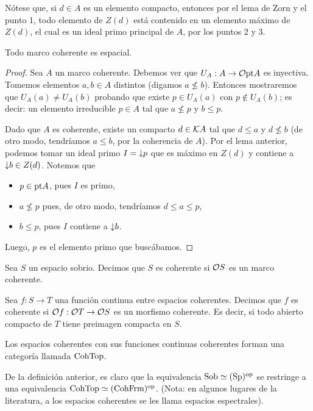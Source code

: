 Nótese que, si $d\in A$ es un elemento compacto,
entonces por el lema de Zorn y el punto 1,
todo elemento de $Z(d)$ está contenido en un elemento máximo de
$Z(d)$, el cual es un ideal primo principal de $A$,
por los puntos 2 y 3.


\begin{lemma}
    Todo marco coherente es espacial.
\end{lemma}
\begin{proof}
    Sea $A$ un marco coherente.
    Debemos ver que $U_A:A\to\cal O\pt A$ es inyectiva.
    Tomemos elementos $a,b\in A$ distintos (digamos $a\nleq b$).
    Entonces mostraremos que $U_A(a)\neq U_A(b)$
    probando que existe $p\in U_A(a)$ con $p\nin U_A(b)$;
    es decir: un elemento irreducible $p\in A$
    tal que $a\nleq p$ y $b\leq p$.
    
    Dado que $A$ es coherente, existe un compacto $d\in\cal KA$
    tal que $d\leq a$ y $d\nleq b$
    (de otro modo, tendríamos $a\leq b$, por la coherencia de $A$).
    Por el lema anterior, podemos tomar un ideal primo
    $I=\down p$ que es máximo en $Z(d)$
    y contiene a $\down b\in Z(d)$.
    Notemos que
    \begin{itemize}
        \item $p\in\pt A$, pues $I$ es primo,
        \item $a\nleq p$ pues, de otro modo,
        tendríamos $d\leq a\leq p$,
        \item $b\leq p$, pues $I$ contiene a $\down b$.
    \end{itemize}
    Luego, $p$ es el elemento primo que buscábamos.
\end{proof}

\begin{defn}
    Sea $S$ un espacio sobrio.
    Decimos que $S$ es coherente
    si $\cal OS$ es un marco coherente.
    
    Sea $f:S\to T$ una función continua entre espacios coherentes.
    Decimos que $f$ es coherente si $\cal Of:\cal OT\to\cal OS$
    es un morfismo coherente.
    Es decir, si todo abierto compacto de $T$ tiene preimagen
    compacta en $S$.
    
    Los espacios coherentes con sus funciones continuas
    coherentes forman una categoría llamada $\CohTop$.
\end{defn}

De la definición anterior,
es claro que la equivalencia $\Sob\simeq(\Sp)^\op$
se restringe a una equivalencia $\CohTop\simeq(\CohFrm)^\op$.
(Nota: en algunos lugares de la literatura, a los espacios
coherentes se les llama espacios espectrales).

